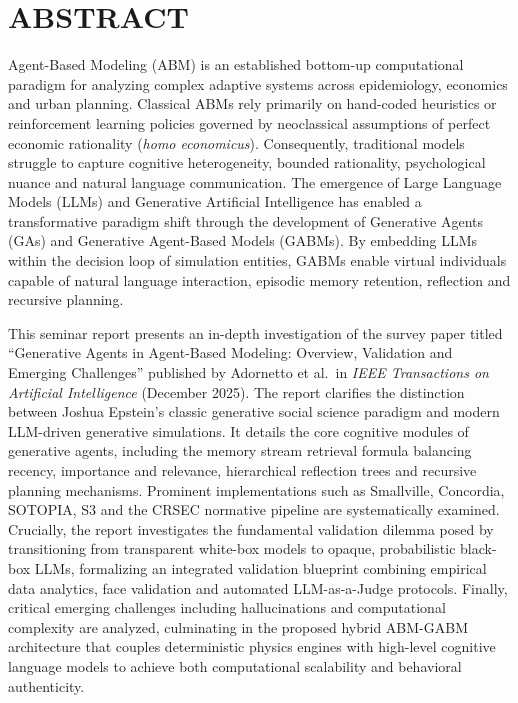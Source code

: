\documentclass[12pt,a4paper]{report}
\begin{document}
\newpage


\chapter*{ABSTRACT}

Agent-Based Modeling (ABM) is an established bottom-up computational paradigm for analyzing complex adaptive systems across epidemiology, economics and urban planning. Classical ABMs rely primarily on hand-coded heuristics or reinforcement learning policies governed by neoclassical assumptions of perfect economic rationality (\textit{homo economicus}). Consequently, traditional models struggle to capture cognitive heterogeneity, bounded rationality, psychological nuance and natural language communication. The emergence of Large Language Models (LLMs) and Generative Artificial Intelligence has enabled a transformative paradigm shift through the development of Generative Agents (GAs) and Generative Agent-Based Models (GABMs). By embedding LLMs within the decision loop of simulation entities, GABMs enable virtual individuals capable of natural language interaction, episodic memory retention, reflection and recursive planning.

This seminar report presents an in-depth investigation of the survey paper titled ``Generative Agents in Agent-Based Modeling: Overview, Validation and Emerging Challenges'' published by Adornetto et al.~in \textit{IEEE Transactions on Artificial Intelligence} (December 2025). The report clarifies the distinction between Joshua Epstein's classic generative social science paradigm and modern LLM-driven generative simulations. It details the core cognitive modules of generative agents, including the memory stream retrieval formula balancing recency, importance and relevance, hierarchical reflection trees and recursive planning mechanisms. Prominent implementations such as Smallville, Concordia, SOTOPIA, S3 and the CRSEC normative pipeline are systematically examined. Crucially, the report investigates the fundamental validation dilemma posed by transitioning from transparent white-box models to opaque, probabilistic black-box LLMs, formalizing an integrated validation blueprint combining empirical data analytics, face validation and automated LLM-as-a-Judge protocols. Finally, critical emerging challenges including hallucinations and computational complexity are analyzed, culminating in the proposed hybrid ABM-GABM architecture that couples deterministic physics engines with high-level cognitive language models to achieve both computational scalability and behavioral authenticity.
\end{document}
